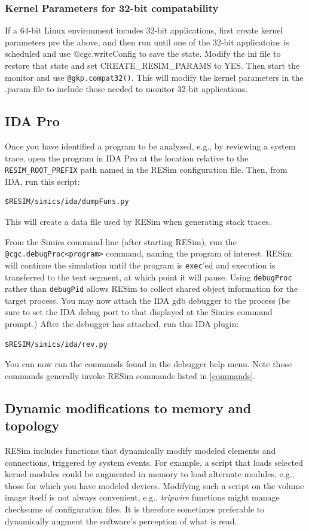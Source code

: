 \documentclass[titlepage]{article}
\begin{document}
\subsubsection{Kernel Parameters for 32-bit compatability}
If a 64-bit Linux environment incudes 32-bit applications, first create kernel parameters pre the above, and then run until one of the 32-bit applicatoins
is scheduled and use @cgc.writeConfig to save
the state.  Modify the ini file to restore that state and set CREATE\_RESIM\_PARAMS to YES.  Then start the monitor and use
{\tt @gkp.compat32()}.  This will modify the kernel parameters in the .param file to include those needed to monitor 32-bit applications.

\subsection{IDA Pro}
Once you have identified a program to be analyzed, e.g., by reviewing a system trace, open the program in IDA Pro at the location relative to the 
{\tt RESIM\_ROOT\_PREFIX} path named in the RESim configuration file.  Then, from IDA, run this script:
\begin{verbatim}
$RESIM/simics/ida/dumpFuns.py 
\end{verbatim}
\noindent This will create a data file used by RESim when generating stack traces.

From the Simics command line (after starting RESim), run the {\tt @cgc.debugProc<program>} command, naming the program of interest.
RESim will continue the simulation until the program is {\tt exec}'ed and execution is transferred to the text segment, at which point it will pause.
Using {\tt debugProc} rather than {\tt debugPid} allows RESim to collect shared object information for the target process.
You may now attach the IDA gdb debugger to the process (be sure to set the IDA debug port to that displayed at the Simics command prompt.)
After the debugger has attached, run this IDA plugin:
\begin{verbatim}
$RESIM/simics/ida/rev.py
\end{verbatim}
You can now run the commands found in the debugger help menu.  Note those commands generally invoke RESim commands listed in \ref{commands}.

\subsection{Dynamic modifications to memory and topology}
\label{diddling}
RESim includes functions that dynamically modify modeled elements and connections,
triggered by system events.  For example, a script that loads selected kernel modules could be augmented in memory to
load alternate modules, e.g., those for which you have modeled devices.  Modifying such a script on the volume
image itself is not always convenient, e.g., \textit{tripwire} functions might manage checksums of
configuration files.  It is therefore sometimes preferable to dynamically augment the software's perception of what is read.
\end{document}
